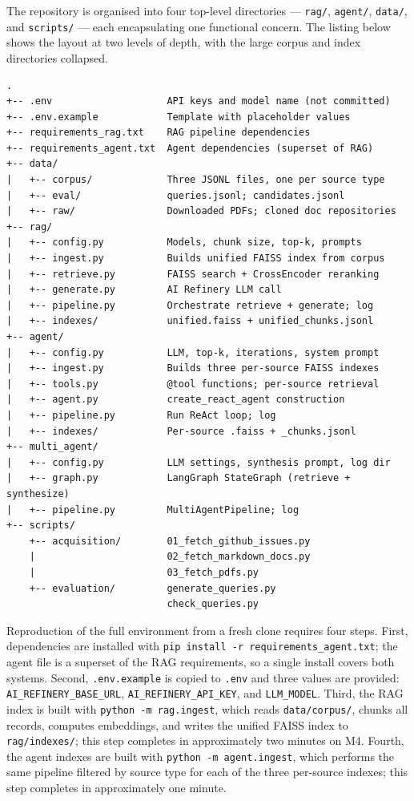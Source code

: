 The repository is organised into four top-level directories — \texttt{rag/}, \texttt{agent/}, \texttt{data/}, and \texttt{scripts/} — each encapsulating one functional concern. The listing below shows the layout at two levels of depth, with the large corpus and index directories collapsed.

\begin{footnotesize}
\begin{verbatim}
.
+-- .env                    API keys and model name (not committed)
+-- .env.example            Template with placeholder values
+-- requirements_rag.txt    RAG pipeline dependencies
+-- requirements_agent.txt  Agent dependencies (superset of RAG)
+-- data/
|   +-- corpus/             Three JSONL files, one per source type
|   +-- eval/               queries.jsonl; candidates.jsonl
|   +-- raw/                Downloaded PDFs; cloned doc repositories
+-- rag/
|   +-- config.py           Models, chunk size, top-k, prompts
|   +-- ingest.py           Builds unified FAISS index from corpus
|   +-- retrieve.py         FAISS search + CrossEncoder reranking
|   +-- generate.py         AI Refinery LLM call
|   +-- pipeline.py         Orchestrate retrieve + generate; log
|   +-- indexes/            unified.faiss + unified_chunks.jsonl
+-- agent/
|   +-- config.py           LLM, top-k, iterations, system prompt
|   +-- ingest.py           Builds three per-source FAISS indexes
|   +-- tools.py            @tool functions; per-source retrieval
|   +-- agent.py            create_react_agent construction
|   +-- pipeline.py         Run ReAct loop; log
|   +-- indexes/            Per-source .faiss + _chunks.jsonl
+-- multi_agent/
|   +-- config.py           LLM settings, synthesis prompt, log dir
|   +-- graph.py            LangGraph StateGraph (retrieve + synthesize)
|   +-- pipeline.py         MultiAgentPipeline; log
+-- scripts/
    +-- acquisition/        01_fetch_github_issues.py
    |                       02_fetch_markdown_docs.py
    |                       03_fetch_pdfs.py
    +-- evaluation/         generate_queries.py
                            check_queries.py
\end{verbatim}
\end{footnotesize}

Reproduction of the full environment from a fresh clone requires four steps. First, dependencies are installed with \texttt{pip install -r requirements\_agent.txt}; the agent file is a superset of the RAG requirements, so a single install covers both systems. Second, \texttt{.env.example} is copied to \texttt{.env} and three values are provided: \texttt{AI\_REFINERY\_BASE\_URL}, \texttt{AI\_REFINERY\_API\_KEY}, and \texttt{LLM\_MODEL}. Third, the RAG index is built with \texttt{python -m rag.ingest}, which reads \texttt{data/corpus/}, chunks all records, computes embeddings, and writes the unified FAISS index to \texttt{rag/indexes/}; this step completes in approximately two minutes on M4. Fourth, the agent indexes are built with \texttt{python -m agent.ingest}, which performs the same pipeline filtered by source type for each of the three per-source indexes; this step completes in approximately one minute.

